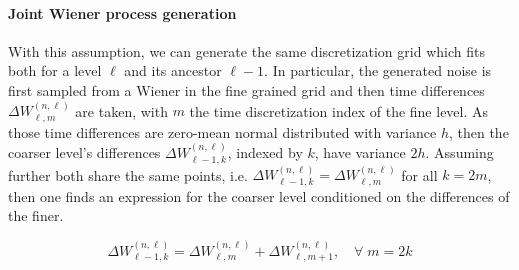 \paragraph{Joint Wiener process generation} \label{par:generation}
With this assumption, we can generate the same discretization grid which fits both for a level $\ell$ and its ancestor $\ell-1$. In particular, the generated noise is first sampled from a Wiener in the fine grained grid and then time differences $\Delta W_{\ell,m}^{(n,\ell)}$ are taken, with $m$ the time discretization index of the fine level.  
As those time differences are zero-mean normal distributed with variance $h$, then the coarser level's differences $\Delta W_{\ell-1,k}^{(n,\ell)}$, indexed by $k$, have variance $2h$. Assuming further both share the same points, i.e. $\Delta W_{\ell-1,k}^{(n,\ell)} = \Delta W_{\ell,m}^{(n,\ell)}$ for all $k = 2m$, then one finds an expression for the coarser level conditioned on the differences of the finer.

\begin{equation}\label{eq:browian_levels}
\Delta W_{\ell-1,k}^{(n,\ell)} = \Delta W_{\ell,m}^{(n,\ell)} + \Delta W_{\ell,m+1}^{(n,\ell)}, \quad \forall \; m = 2k
\end{equation}

